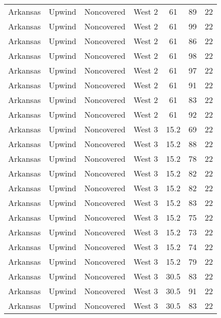 \documentclass{article}
\begin{document}
\begin{longtable}[H]{ccccccc}
Arkansas & Upwind    & Noncovered & West 2        & 61           & 89          & 22  \\
Arkansas & Upwind    & Noncovered & West 2        & 61           & 99          & 22  \\
Arkansas & Upwind    & Noncovered & West 2        & 61           & 86          & 22  \\
Arkansas & Upwind    & Noncovered & West 2        & 61           & 98          & 22  \\
Arkansas & Upwind    & Noncovered & West 2        & 61           & 97          & 22  \\
Arkansas & Upwind    & Noncovered & West 2        & 61           & 91          & 22  \\
Arkansas & Upwind    & Noncovered & West 2        & 61           & 83          & 22  \\
Arkansas & Upwind    & Noncovered & West 2        & 61           & 92          & 22  \\
Arkansas & Upwind    & Noncovered & West 3        & 15.2         & 69          & 22  \\
Arkansas & Upwind    & Noncovered & West 3        & 15.2         & 88          & 22  \\
Arkansas & Upwind    & Noncovered & West 3        & 15.2         & 78          & 22  \\
Arkansas & Upwind    & Noncovered & West 3        & 15.2         & 82          & 22  \\
Arkansas & Upwind    & Noncovered & West 3        & 15.2         & 82          & 22  \\
Arkansas & Upwind    & Noncovered & West 3        & 15.2         & 83          & 22  \\
Arkansas & Upwind    & Noncovered & West 3        & 15.2         & 75          & 22  \\
Arkansas & Upwind    & Noncovered & West 3        & 15.2         & 73          & 22  \\
Arkansas & Upwind    & Noncovered & West 3        & 15.2         & 74          & 22  \\
Arkansas & Upwind    & Noncovered & West 3        & 15.2         & 79          & 22  \\
Arkansas & Upwind    & Noncovered & West 3        & 30.5         & 83          & 22  \\
Arkansas & Upwind    & Noncovered & West 3        & 30.5         & 91          & 22  \\
Arkansas & Upwind    & Noncovered & West 3        & 30.5         & 83          & 22  \\

\end{longtable}
\end{document}
